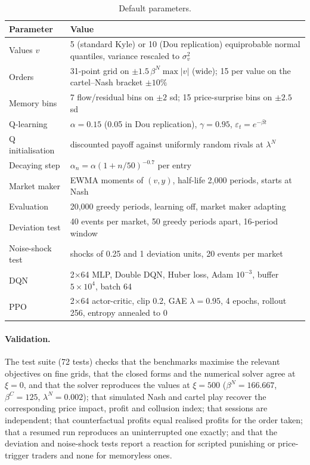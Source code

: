 \begin{table}[h]
  \centering
  \small
  \begin{tabular}{ll}
    \toprule
    Parameter & Value \\
    \midrule
    Values $v$ & 5 (standard Kyle) or 10 (Dou replication) equiprobable normal quantiles, variance rescaled to $\sigma_v^2$ \\
    Orders & 31-point grid on $\pm1.5\,\beta^N\max|v|$ (wide); 15 per value on the cartel--Nash bracket $\pm10\%$ \\
    Memory bins & 7 flow/residual bins on $\pm2$ sd; 15 price-surprise bins on $\pm2.5$ sd \\
    Q-learning & $\alpha=0.15$ (0.05 in Dou replication), $\gamma=0.95$, $\varepsilon_t=e^{-\beta t}$ \\
    Q initialisation & discounted payoff against uniformly random rivals at $\lambda^N$ \\
    Decaying step & $\alpha_n=\alpha(1+n/50)^{-0.7}$ per entry \\
    Market maker & EWMA moments of $(v,y)$, half-life 2{,}000 periods, starts at Nash \\
    Evaluation & 20{,}000 greedy periods, learning off, market maker adapting \\
    Deviation test & 40 events per market, 50 greedy periods apart, 16-period window \\
    Noise-shock test & shocks of 0.25 and 1 deviation units, 20 events per market \\
    DQN & 2$\times$64 MLP, Double DQN, Huber loss, Adam $10^{-3}$, buffer $5\times10^4$, batch 64 \\
    PPO & 2$\times$64 actor-critic, clip 0.2, GAE $\lambda=0.95$, 4 epochs, rollout 256, entropy annealed to 0 \\
    \bottomrule
  \end{tabular}
  \caption{Default parameters.}
  \label{tab:params}
\end{table}

\paragraph{Validation.} The test suite (72 tests) checks that the benchmarks
maximise the relevant objectives on fine grids, that the closed forms and the
numerical solver agree at $\xi=0$, and that the solver reproduces the
\citet{dou2025} values at $\xi=500$ ($\beta^N=166.667$, $\beta^C=125$,
$\lambda^N=0.002$); that simulated Nash and cartel play recover the
corresponding price impact, profit and collusion index; that sessions are
independent; that counterfactual profits equal realised profits for the
order taken; that a resumed run reproduces an uninterrupted one exactly; and
that the deviation and noise-shock tests report a reaction for scripted
punishing or price-trigger traders and none for memoryless ones.
